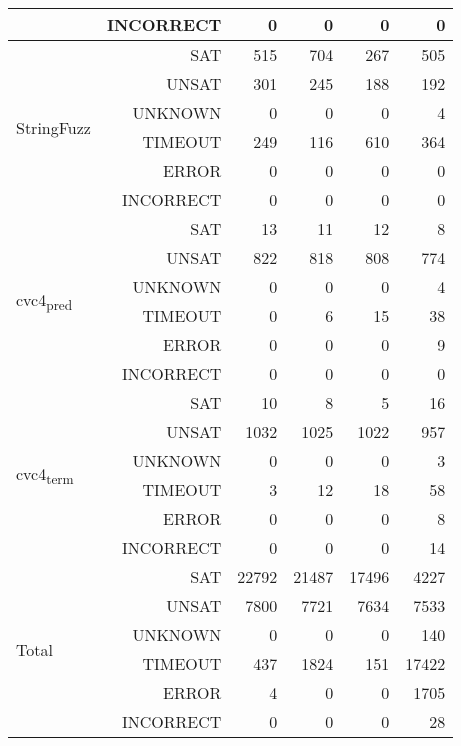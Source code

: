 \begin{table}[h]
{{\begin{tabular}{|l r | r r r r |}
							& INCORRECT&     0&     0&     0&     0 \\ \hline
\multirow{6}{*}{StringFuzz}	& SAT      &   515&   704&   267&   505 \\
							& UNSAT    &   301&   245&   188&   192 \\
							& UNKNOWN  &     0&     0&     0&     4 \\
							& TIMEOUT  &   249&   116&   610&   364 \\
							& ERROR    &     0&     0&     0&     0 \\
							& INCORRECT&     0&     0&     0&     0 \\\hline
\multirow{6}{*}{cvc4\textsubscript{pred}} & SAT &    13&    11&    12&     8 \\
							& UNSAT    &   822&   818&   808&   774 \\
							& UNKNOWN  &     0&     0&     0&     4 \\
							& TIMEOUT  &     0&     6&    15&    38 \\
							& ERROR    &     0&     0&     0&     9 \\
							& INCORRECT&     0&     0&     0&     0 \\ \hline
\multirow{6}{*}{cvc4\textsubscript{term}} & SAT &    10&     8&     5&    16 \\
							& UNSAT    &  1032&  1025&  1022&   957 \\
							& UNKNOWN  &     0&     0&     0&     3 \\
							& TIMEOUT  &     3&    12&    18&    58 \\
							& ERROR    &     0&     0&     0&     8 \\
							& INCORRECT&     0&     0&     0&    14 \\ \hline \hline
\multirow{6}{*}{Total} 		& SAT      & 22792& 21487& 17496&  4227\\
							& UNSAT    &  7800&  7721&  7634&  7533\\
							& UNKNOWN  &     0&     0&     0&   140\\
							& TIMEOUT  &  437&  1824&  151& 17422 \\
							& ERROR    &     4&     0&     0&  1705 \\
							& INCORRECT&     0&     0&     0&    28 \\\hline
\end{tabular}}
\label{table:base_benchmark}}
\end{table}

